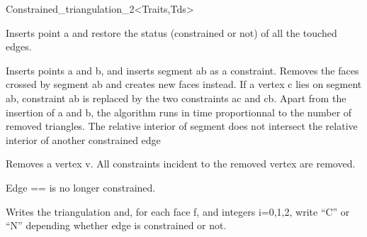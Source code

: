 \begin{ccClassTemplate} {Constrained_triangulation_2<Traits,Tds>}

{ Inserts point a and restore the status (constrained or not) of all
the
touched edges.}

{ Inserts points a and b, and inserts segment ab as a
constraint. Removes the faces crossed by segment ab and creates new
faces instead. If a vertex c lies on segment ab, constraint ab is
replaced by the two constraints ac and cb. Apart from the insertion of
a and b, the algorithm runs in time proportionnal to the number of
removed triangles. 
\ccPrecond The relative interior of segment  does not
intersect the relative interior of another constrained edge}




{ Removes a vertex v. All constraints incident to the removed vertex are removed. }

{ Edge == is no longer constrained.}


{Writes the triangulation and, for each face f, and integers i=0,1,2,
write ``C'' or ``N'' depending whether edge 
 is constrained or not.}



\end{ccClassTemplate}
